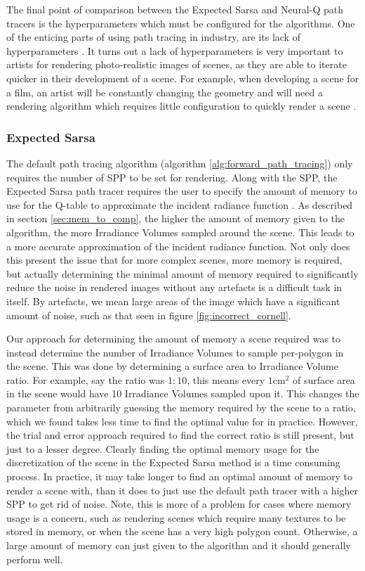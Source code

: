 \documentclass[../dissertation.tex]{subfiles}
\begin{document}
The final point of comparison between the Expected Sarsa and Neural-Q path tracers is the hyperparameters which must be configured for the algorithms. One of the enticing parts of using path tracing in industry, are its lack of hyperparameters \cite{georgiev2018arnold}. It turns out a lack of hyperparameters is very important to artists for rendering photo-realistic images of scenes, as they are able to iterate quicker in their development of a scene. For example, when developing a scene for a film, an artist will be constantly changing the geometry and will need a rendering algorithm which requires little configuration to quickly render a scene \cite{georgiev2018arnold}.

\subsubsection{Expected Sarsa}
The default path tracing algorithm (algorithm \ref{alg:forward_path_tracing}) only requires the number of SPP to be set for rendering. Along with the SPP, the Expected Sarsa path tracer requires the user to specify the amount of memory to use for the Q-table to approximate the incident radiance function \cite{dahm2017learning}. As described in section \ref{sec:mem_to_comp}, the higher the amount of memory given to the algorithm, the more Irradiance Volumes sampled around the scene. This leads to a more accurate approximation of the incident radiance function. Not only does this present the issue that for more complex scenes, more memory is required, but actually determining the minimal amount of memory required to significantly reduce the noise in rendered images without any artefacts  is a difficult task in itself. By artefacts, we mean large areas of the image which have a significant amount of noise, such as that seen in figure \ref{fig:incorrect_cornell}.

Our approach for determining the amount of memory a scene required was to instead determine the number of Irradiance Volumes to sample per-polygon in the scene. This was done by determining a surface area to Irradiance Volume ratio. For example, say the ratio was $1:10$, this means every $1 \text{cm}^2$ of surface area in the scene would have 10 Irradiance Volumes sampled upon it. This changes the parameter from arbitrarily guessing the memory required by the scene to a ratio, which we found takes less time to find the optimal value for in practice. However, the trial and error approach required to find the correct ratio is still present, but just to a lesser degree. Clearly finding the optimal memory usage for the discretization of the scene in the Expected Sarsa method is a time consuming process. In practice, it may take longer to find an optimal amount of memory to render a scene with, than it does to just use the default path tracer with a higher SPP to get rid of noise. Note, this is more of a problem for cases where memory usage is a concern, such as rendering scenes which require many textures to be stored in memory, or when the scene has a very high polygon count. Otherwise, a large amount of memory can just given to the algorithm and it should generally perform well.
 
\end{document}
